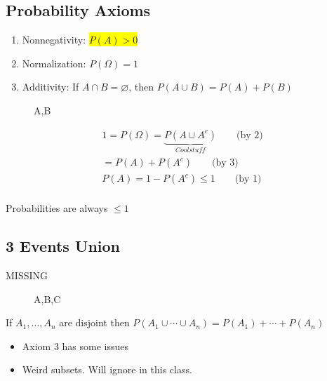 \subsection{Probability Axioms}

\begin{enumerate}
    \item Nonnegativity: \colorbox{yellow}{$P(A) > 0$}
    \item Normalization: $P(\Omega)=1$
    \item Additivity: If $A \cap B = \varnothing$, then $P(A \cup B)=P(A) + P(B)$
\end{enumerate}

\begin{figure}[!ht]
\centering
{}
\caption{A,B} \label{fig:M2}
\end{figure}

\begin{align*}
1 = P(\Omega) = \underbrace{P(A \cup A^c)}_{Cool stuff} \qquad \text{(by 2)}\\
= P(A) + P(A^c)  \qquad \text{(by 3)}\\
P(A) = 1 - P(A^c) \le 1  \qquad \text{(by 1)}\\
\end{align*}

Probabilities are always $\le 1$

\subsection{3 Events Union}

MISSING

\begin{figure}[!ht]
\centering
{}
\caption{A,B,C} \label{fig:M3}
\end{figure}

If $A_1,\ldots, A_n$ are disjoint then $P(A_1 \cup \cdots \cup A_n) = P(A_1) + \cdots + P(A_n)$

\begin{itemize}
    \item Axiom 3 has some issues 
    \item Weird subsets.  Will ignore in this class.
\end{itemize}

